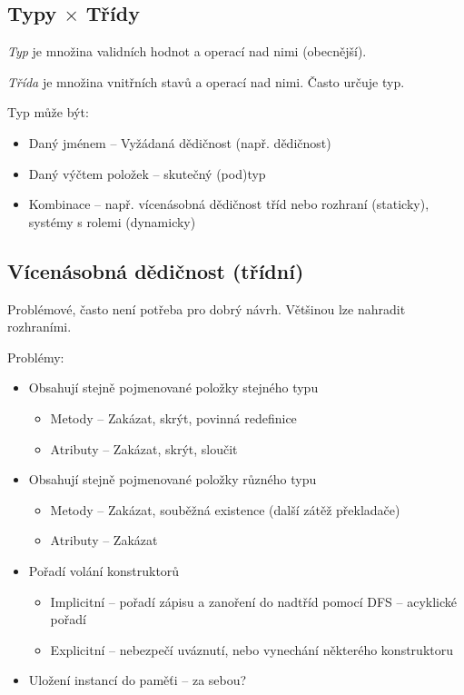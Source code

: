 \documentclass[a4wide]{report}
\begin{document}
\subsection{Typy $\times$ Třídy}

\emph{Typ} je množina validních hodnot a operací nad nimi (obecnější).

\emph{Třída} je množina vnitřních stavů a operací nad nimi. Často určuje typ.

Typ může být:
\begin{itemize}
	\item Daný jménem -- Vyžádaná dědičnost (např. dědičnost)
	\item Daný výčtem položek -- skutečný (pod)typ
	\item Kombinace -- např. vícenásobná dědičnost tříd nebo rozhraní (staticky), systémy s rolemi (dynamicky)
\end{itemize}

\subsection{Vícenásobná dědičnost (třídní)}

Problémové, často není potřeba pro dobrý návrh. Většinou lze nahradit rozhraními.

Problémy:
\begin{itemize}
	\item Obsahují stejně pojmenované položky stejného typu
	\begin{itemize}
		\item Metody -- Zakázat, skrýt, povinná redefinice
		\item Atributy -- Zakázat, skrýt, sloučit
	\end{itemize}
	\item Obsahují stejně pojmenované položky různého typu
	\begin{itemize}
		\item Metody -- Zakázat, souběžná existence (další zátěž překladače)
		\item Atributy -- Zakázat
	\end{itemize}
	\item Pořadí volání konstruktorů
	\begin{itemize}
		\item Implicitní -- pořadí zápisu a zanoření do nadtříd pomocí DFS -- acyklické pořadí
		\item Explicitní -- nebezpečí uváznutí, nebo vynechání některého konstruktoru
	\end{itemize}
	\item Uložení instancí do paměťi -- za sebou?
\end{itemize}
\end{document}
